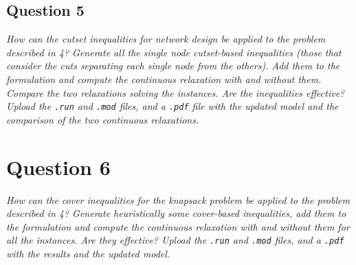 \documentclass[10pt]{article}
\begin{document}
    \subsection*{Question 5}
    \textit{How can the cutset inequalities for network design be applied to the problem described in 4? Generate all the single node cutset-based inequalities (those that consider the cuts separating each single node from the others). Add them to the formulation and compute the continuous relaxation with and without them. Compare the two relaxations solving the instances. Are the inequalities effective? Upload the \texttt{.run} and \texttt{.mod} files, and a \texttt{.pdf} file with the updated model and the comparison of the two continuous relaxations.}

    \section*{Question 6}
    \textit{How can the cover inequalities for the knapsack problem be applied to the problem described in 4? Generate heuristically some cover-based inequalities, add them to the formulation and compute the continuous relaxation with and without them for all the instances. Are they effective? Upload the \texttt{.run} and \texttt{.mod} files, and a \texttt{.pdf} with the results and the updated model.}
\end{document}
